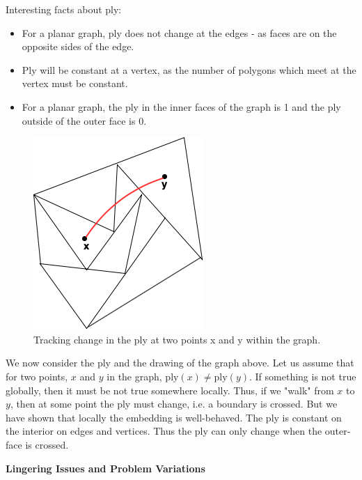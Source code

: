 \documentclass{article}
\begin{document}
     
    \medskip \noindent Interesting facts about ply:
    \begin{itemize}
        \item For a planar graph, ply does not change at the edges - as faces are on the opposite sides of the edge.
        \item Ply will be constant at a vertex, as the number of polygons which meet at the vertex must be constant.
        \item For a planar graph, the ply in the inner faces of the graph is 1 and the ply outside of the outer face is 0.
    \end{itemize}
    
    \begin{figure}[H]
    \centering
    \includegraphics[scale=0.5]{Images/change_of_ply_from_x_to_y.png}
    \caption{Tracking change in the ply at two points x and y within the graph.}
    \label{fig:my_label}
    \end{figure}
    \medskip \noindent We now consider the ply and the drawing of the graph above. Let us assume that for two points, $x$ and $y$ in the graph, $\text{ply}(x) \neq \text{ply}(y)$. If something is not true globally, then it must be not true somewhere locally. Thus, if we "walk" from $x$ to $y$, then at some point the ply must change, i.e. a boundary is crossed. But we have shown that locally the embedding is well-behaved. The ply is constant on the interior on edges and vertices. Thus the ply can only change when the outer-face is crossed. 
    
    \medskip \noindent \textbf{Lingering Issues and Problem Variations}
  
\end{document}
